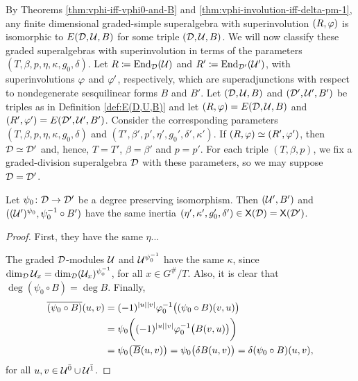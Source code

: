 By Theorems \ref{thm:vphi-iff-vphi0-and-B} and \ref{thm:vphi-involution-iff-delta-pm-1}, any finite dimensional graded-simple superalgebra with superinvolution $(R, \varphi)$ is isomorphic to $E(\mathcal{D}, \mathcal U, B)$ for some triple $(\mathcal{D}, \mathcal U, B)$. 
We will now classify these graded superalgebras with superinvolution in terms of the parameters $(T, \beta, p, \eta, \kappa, g_0, \delta)$.  
Let $R \coloneqq \operatorname{End}_{\mathcal{D}} (\mathcal U)$ and $R' \coloneqq \operatorname{End}_{\mathcal{D}'} (\mathcal U')$, with superinvolutions $\varphi$ and $\varphi'$, respectively, which are superadjunctions with respect to nondegenerate sesquilinear forms $B$ and $B'$. 
Let $(\mathcal{D}, \mathcal U, B)$ and $(\mathcal{D}', \mathcal U', B')$ be triples as in Definition \ref{def:E(D,U,B)} and let $(R, \varphi) = E(\mathcal{D}, \mathcal U, B)$ and $(R', \varphi') = E(\mathcal{D}', \mathcal U', B')$.
Consider the corresponding parameters $(T, \beta, p, \eta, \kappa, g_0, \delta)$ and $(T', \beta', p', \eta', g_0', \delta', \kappa')$. 
If $(R, \varphi) \simeq (R', \varphi')$, then $\mathcal{D} \simeq \mathcal{D}'$ and, hence, $T = T'$, $\beta = \beta'$ and $p = p'$. 
For each triple $(T, \beta, p)$, we fix a graded-division superalgebra $\mathcal{D}$ with these parameters, so we may suppose $\mathcal{D} = \mathcal{D}'$.

\begin{lemma}
    Let $\psi_0\colon \mathcal{D} \to \mathcal{D}'$ be a degree preserving isomorphism. 
    Then $(\mathcal U',B')$ and $((\mathcal U')^{\psi_0}, \psi_0^{-1} \circ B')$ have the same inertia $(\eta', \kappa', g_0', \delta') \in \mathsf{X}(\mathcal{D}) = \mathsf{X}(\mathcal{D}')$.
\end{lemma}

\begin{proof}
    First, they have the same $\eta$...
    
    The graded $\mathcal{D}$-modules $\mathcal U$ and $\mathcal U^{\psi_0^{-1}}$ have the same $\kappa$, since $\dim_{\mathcal{D}} \mathcal U_x = \dim_{\mathcal{D}} (\mathcal U_x)^{\psi_0^{-1}}$, for all $x \in G^\#/T$. 
Also, it is clear that $\deg (\psi_0 \circ B) = \deg B$. 
Finally, 
\begin{align*}
    \overline{(\psi_0 \circ B)} (u,v) &= (-1)^{|u||v|} \varphi_0^{-1} \big( (\psi_0 \circ B)(v, u) \big) \\
    &= \psi_0 \bigg( (-1)^{|u||v|} \varphi_0^{-1} \big( B(v,u) \big) \bigg) \\
    &= \psi_0 \big( \overline B (u,v) \big) = \psi_0 \big( \delta B (u,v) \big) = \delta (\psi_0 \circ B) (u,v),
\end{align*}
for all $u, v \in \mathcal U^{\bar0} \cup \mathcal U^{\bar1}$.
\end{proof}

